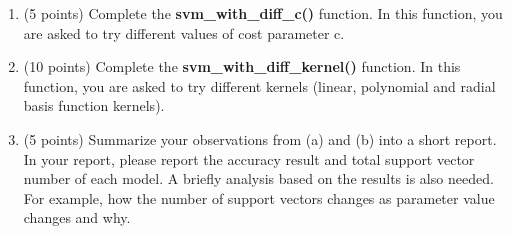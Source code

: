 \documentclass[11pt]{article}
\begin{document}
\begin{enumerate}
\begin{enumerate}
\item (5 points) Complete the \textbf{svm\_with\_diff\_c()}
function. In this function, you are asked to try different values
of cost parameter c.
\item (10 points) Complete the \textbf{svm\_with\_diff\_kernel()}
function. In this function, you are asked to try different
kernels (linear, polynomial and radial basis function kernels).
\item (5 points) Summarize your observations from (a) and (b)
into a short report. In your report, please report the accuracy
result and total support vector number of each model. A briefly
analysis based on the results is also needed. For example, how
the number of support vectors changes as parameter value changes
and why.
\end{enumerate}


\end{enumerate}
\end{document}
